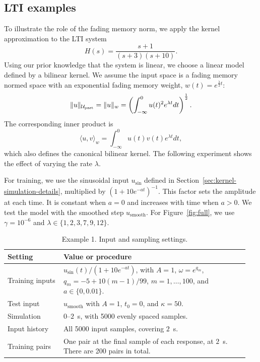 \subsection{LTI examples}
\begin{example}
To illustrate the role of the fading memory norm, we apply the kernel approximation to the LTI system
$$H(s)=\frac{s+1}{(s+3)(s+10)}.$$
Using our prior knowledge that the system is linear, we choose a linear model defined by a bilinear kernel. We assume the input space is a fading memory normed space with an exponential fading memory weight, $w(t)=e^{\frac{\lambda}{2} t}$\label{def:exponential-fading-weight}:
$$
\|u\|_{{\cal U}_\text{past}}=\|u\|_w=\left(\int_{-\infty}^{0}u(t)^2e^{\lambda t}dt\right)^{\frac{1}{2}}.
$$
The corresponding inner product is
$$
\langle u,v \rangle_w=\int_{-\infty}^{0}u(t)v(t)e^{\lambda t}dt,
$$
which also defines the canonical bilinear kernel. The following experiment shows the effect of varying the rate $\lambda$.

\textcolor{examineredit}{For training, we use the sinusoidal input \(u_{\mathrm{sin}}\) defined in Section~\ref{sec:kernel-simulation-details}, multiplied by \((1+10e^{-at})^{-1}\). This factor sets the amplitude at each time. It is constant when \(a=0\) and increases with time when \(a>0\). We test the model with the smoothed step \(u_{\mathrm{smooth}}\).} For Figure~\ref{fig:full}, we use \(\gamma=10^{-6}\) and \(\lambda\in\{1,2,3,7,9,12\}\).

\begin{table}[H]
    \centering
    \color{examineredit}
    \small
    \renewcommand{\arraystretch}{1.15}
    \caption{\textcolor{examineredit}{Example 1. Input and sampling settings.}}
    \label{tab:kernel-example1-settings}
    \begin{tabular}{@{}p{0.22\linewidth}p{0.73\linewidth}@{}}
        \toprule
        Setting & Value or procedure \\
        \midrule
        Training inputs & \(u_{\mathrm{sin}}(t)/(1+10e^{-at})\), with \(A=1\), \(\omega=e^{q_m}\), \(q_m=-5+10(m-1)/99\), \(m=1,\ldots,100\), and \(a\in\{0,0.01\}\). \\[4pt]
        Test input & \(u_{\mathrm{smooth}}\) with \(A=1\), \(t_0=0\), and \(\kappa=50\). \\[4pt]
        Simulation & \(0\)--\(2\)~s, with 5000 evenly spaced samples. \\[4pt]
        Input history & All 5000 input samples, covering \(2\)~s. \\[4pt]
        Training pairs & One pair at the final sample of each response, at \(2\)~s. There are 200 pairs in total. \\
        \bottomrule
    \end{tabular}
\end{table}



\end{example}
